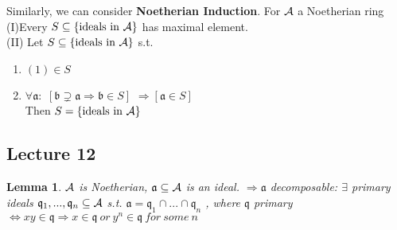 \documentclass[11pt]{article}
\newtheorem{lemma}[thm]{Lemma}
\newcommand{\sca}{{\mathfrak a}}
\newcommand{\scb}{{\mathfrak b}}
\newcommand{\scq}{\mathfrak q}
\newcommand{\cala}{{\cal A}}
\newcommand{\Lrta}{\Longrightarrow}
\newcommand{\Llrta}{\Longleftrightarrow}
\begin{document}
Similarly, we can consider 
\textbf{Noetherian Induction}. For $\cala$ a Noetherian ring\\
(I)Every $S\subseteq\{\text{ideals in $\cala$}\}$  has maximal element.
\\
(II) Let $S\subseteq\{\text{ideals in $\cala$}\}$ s.t.
\begin{enumerate}[label=(\alph*)]
\item $(1)\in S$
\item $\forall\sca:$  $[\scb\supsetneq\sca\Lrta \scb\in S]$ $\Lrta [\sca\in S]$\\
Then $S=\{\text{ideals in $\cala$}\}$
\end{enumerate}

\subsection{Lecture 12}
\begin{lemma}
$\cala$ is Noetherian, $\sca\subseteq \cala$ is an ideal. $\Lrta\sca$ decomposable:
$\exists $ primary ideals $\scq_1,...,\scq_n\subseteq \cala$ s.t. $\sca=\scq_1\cap...\cap\scq_n$
, where $\scq$ primary $\Llrta x y\in \scq\Lrta x\in \scq\ or\ y^n\in \scq\ for\ some \ n$\end{lemma}
\end{document}
